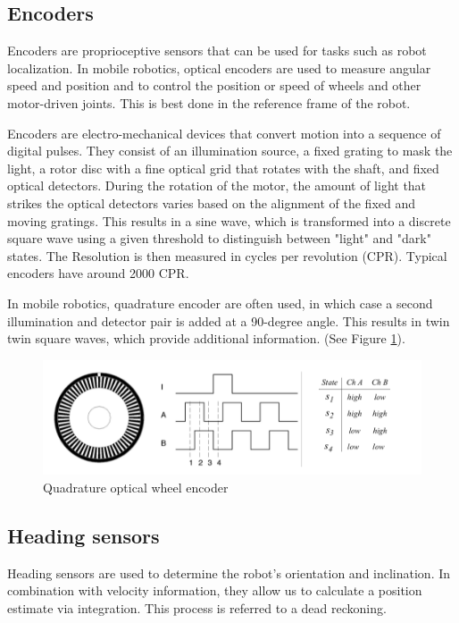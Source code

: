 \subsection{Encoders}
Encoders are proprioceptive sensors that can be used for tasks such as robot localization. In mobile robotics, optical encoders are used to measure angular speed and position and to control the position or speed of wheels and other motor-driven joints. This is best done in the reference frame of the robot.

Encoders are electro-mechanical devices that convert motion into a sequence of digital pulses. They consist of an illumination source, a fixed grating to mask the light, a rotor disc with a fine optical grid that rotates with the shaft, and fixed optical detectors. During the rotation of the motor, the amount of light that strikes the optical detectors varies based on the alignment of the fixed and moving gratings. This results in a sine wave, which is transformed into a discrete square wave using a given threshold to distinguish between "light" and "dark" states. The Resolution is then measured in cycles per revolution (CPR). Typical encoders have around 2000 CPR.

In mobile robotics, quadrature encoder are often used, in which case a second illumination and detector pair is added at a 90-degree angle. This results in twin twin square waves, which provide additional information. (See Figure \ref{fig:encoder}).

\begin{figure}[H]
\centering
        \includegraphics[width =11 cm]{Enc.png}
        \caption{Quadrature optical wheel encoder \cite{SNS}}
        \label{fig:encoder}
\end{figure}





\subsection{Heading sensors}
Heading sensors are used to determine the robot’s orientation and inclination. In combination with velocity information, they allow us to calculate a position estimate via integration. This process is referred to a dead reckoning.
